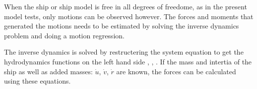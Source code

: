 \documentclass[review]{elsarticle}
\begin{document}
\sphinxAtStartPar
When the ship or ship model is free in all degrees of freedome, as in the present model tests, only motions can be observed however. The forces and moments that generated the motions needs to be estimated by solving the inverse dynamics problem and doing a motion regression.

\sphinxAtStartPar
The inverse dynamics is solved by restructering the system equation {\hyperref[\detokenize{03.01_inverse_dynamics:equation-eqsystem}]{}} to get the hydrodynamics functions on the left hand side {\hyperref[\detokenize{03.01_inverse_dynamics:equation-eqxd}]{}}, {\hyperref[\detokenize{03.01_inverse_dynamics:equation-eqyd}]{}}, {\hyperref[\detokenize{03.01_inverse_dynamics:equation-eqnd}]{}}. If the mass and intertia of the ship as well as added masses: \(\dot{u}\), \(\dot{v}\), \(\dot{r}\) are known, the forces can be calculated using these equations.
\end{document}
